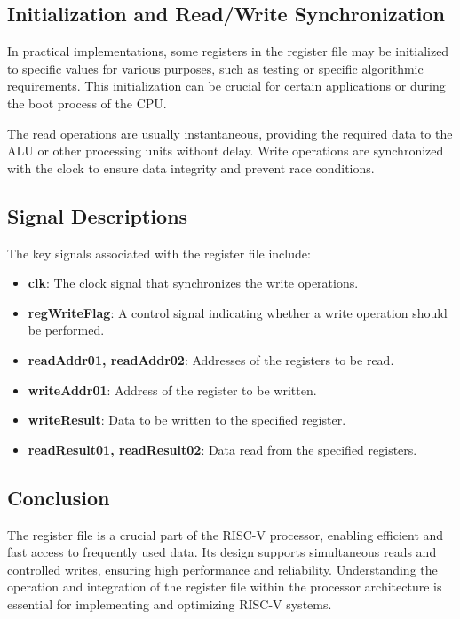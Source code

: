\subsection{Initialization and Read/Write Synchronization}
In practical implementations, some registers in the register file may be initialized to specific values for various purposes, such as testing or specific algorithmic requirements. This initialization can be crucial for certain applications or during the boot process of the CPU.

The read operations are usually instantaneous, providing the required data to the ALU or other processing units without delay. Write operations are synchronized with the clock to ensure data integrity and prevent race conditions.

\subsection{Signal Descriptions}
The key signals associated with the register file include:
\begin{itemize}
    \item \textbf{clk}: The clock signal that synchronizes the write operations.
    \item \textbf{regWriteFlag}: A control signal indicating whether a write operation should be performed.
    \item \textbf{readAddr01, readAddr02}: Addresses of the registers to be read.
    \item \textbf{writeAddr01}: Address of the register to be written.
    \item \textbf{writeResult}: Data to be written to the specified register.
    \item \textbf{readResult01, readResult02}: Data read from the specified registers.
\end{itemize}

\subsection{Conclusion}
The register file is a crucial part of the RISC-V processor, enabling efficient and fast access to frequently used data. Its design supports simultaneous reads and controlled writes, ensuring high performance and reliability. Understanding the operation and integration of the register file within the processor architecture is essential for implementing and optimizing RISC-V systems.

